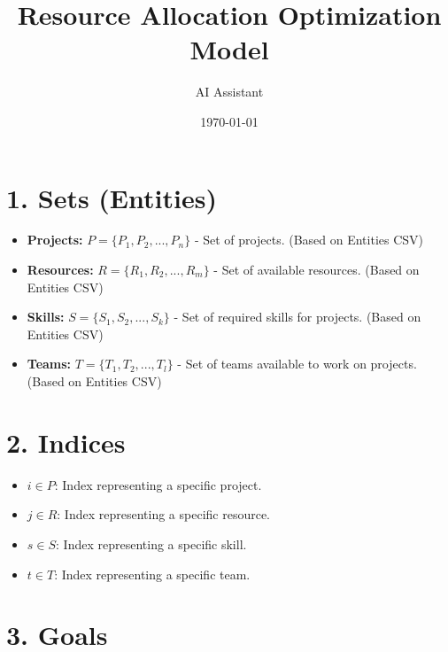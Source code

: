 \documentclass{article}
\title{Resource Allocation Optimization Model}
\author{AI Assistant}
\date{\today}
\begin{document}
\maketitle

\tableofcontents

\newpage

\section{1. Sets (Entities)}

\begin{itemize}
    \item \textbf{Projects:} $P = \{P_1, P_2, ..., P_n\}$ -  Set of projects. (Based on Entities CSV)
    \item \textbf{Resources:} $R = \{R_1, R_2, ..., R_m\}$ - Set of available resources. (Based on Entities CSV)
    \item \textbf{Skills:} $S = \{S_1, S_2, ..., S_k\}$ - Set of required skills for projects. (Based on Entities CSV)
    \item \textbf{Teams:} $T = \{T_1, T_2, ..., T_l\}$ - Set of teams available to work on projects. (Based on Entities CSV)
\end{itemize}

\section{2. Indices}

\begin{itemize}
    \item $i \in P$: Index representing a specific project.
    \item $j \in R$: Index representing a specific resource.
    \item $s \in S$: Index representing a specific skill.
    \item $t \in T$: Index representing a specific team.
\end{itemize}

\section{3. Goals}
\end{document}
